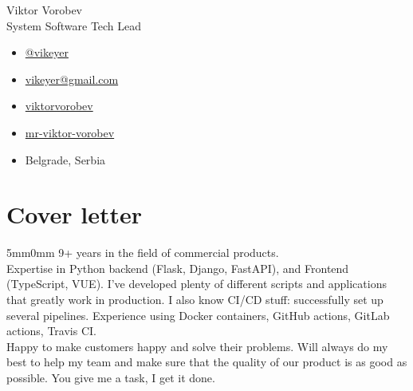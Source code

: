 \documentclass[10pt]{article}
\newcommand{\lmvalue}{5mm}
\newcommand{\rmvalue}{0mm}
\begin{document}
\begin{minipage}[b]{0.78\linewidth}
	{\fontsize{28pt}{28pt}\selectfont Viktor Vorobev}
	\\[1em]
	{\color{gray}\fontsize{16pt}{16pt}\selectfont System Software Tech Lead}
\end{minipage}
\hfill%
\begin{minipage}[b]{0.24\linewidth}
	\begin{flushleft}
		\begin{itemize}
			\item[\color{cyan}\faPaperPlane] \href{https://t.me/vikeyer}{@vikeyer}
			\item[\color{cyan}\faEnvelope] \href{mailto:vikeyer@gmail.com}{vikeyer@gmail.com}
			\item[\color{cyan}\faGithub] \href{https://github.com/viktorvorobev}{viktorvorobev}
			\item[\color{cyan}\faLinkedin] \href{https://www.linkedin.com/in/mr-viktor-vorobev/}{mr-viktor-vorobev}
			\item[\faBuildingO] Belgrade, Serbia
		\end{itemize}
	\end{flushleft}
\end{minipage}
\vspace{3mm}
\section*{Cover letter}
\begin{changemargin}{\lmvalue}{\rmvalue}
	9+ years in the field of commercial products. \\
	Expertise in Python backend (Flask, Django, FastAPI), and Frontend (TypeScript, VUE).
	I've developed plenty of different scripts and applications that greatly work in production.
	I also know CI/CD stuff: successfully set up several pipelines.
	Experience using Docker containers, GitHub actions, GitLab actions, Travis CI. \\
	Happy to make customers happy and solve their problems.
	Will always do my best to help my team and make sure that the quality of our product is as good as possible.
	You give me a task, I get it done.
\end{changemargin}
\end{document}
